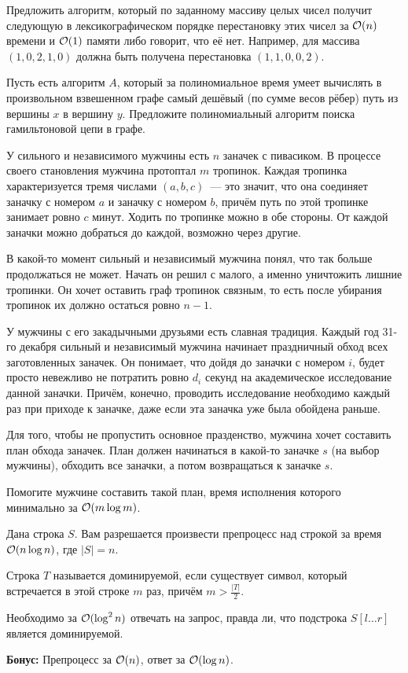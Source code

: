 \documentclass[addpoints]{exam}
\begin{document}
\begin{questions}
%

\question Предложить алгоритм, который по заданному массиву целых чисел получит следующую в лексикографическом порядке перестановку этих чисел за $\mathcal{O}(n)$ времени и $\mathcal{O}(1)$ памяти либо говорит, что её нет. Например, для массива $(1,0,2,1,0)$ должна быть получена перестановка $(1,1,0,0,2)$.

\question Пусть есть алгоритм $A$, который за полиномиальное время умеет вычислять в произвольном взвешенном графе самый дешёвый (по сумме весов рёбер) путь из вершины $x$ в вершину $y$. Предложите полиномиальный алгоритм поиска гамильтоновой цепи в графе.

\question У сильного и независимого мужчины есть $n$ заначек с пивасиком. В процессе своего становления мужчина протоптал $m$ тропинок. Каждая тропинка характеризуется тремя числами $(a,b,c)$~--- это значит, что она соединяет заначку с номером $a$ и заначку с номером $b$, причём путь по этой тропинке занимает ровно $c$ минут. Ходить по тропинке можно в обе стороны. От каждой заначки можно добраться до каждой, возможно через другие.

В какой-то момент сильный и независимый мужчина понял, что так больше продолжаться не может. Начать он решил с малого, а именно уничтожить лишние тропинки. Он хочет оставить граф тропинок связным, то есть после убирания тропинок их должно остаться ровно $n-1$.

У мужчины с его закадычными друзьями есть славная традиция. Каждый год 31-го декабря сильный и независимый мужчина начинает праздничный обход всех заготовленных заначек. Он понимает, что дойдя до заначки с номером $i$, будет просто невежливо не потратить ровно $d_i$ секунд на академическое исследование данной заначки. Причём, конечно, проводить исследование необходимо каждый раз при приходе к заначке, даже если эта заначка уже была обойдена раньше. 

Для того, чтобы не пропустить основное празденство, мужчина хочет составить план обхода заначек. План должен начинаться в какой-то заначке $s$ (на выбор мужчины), обходить все заначки, а потом возвращаться к заначке $s$.

Помогите мужчине составить такой план, время исполнения которого минимально за $\mathcal{O}(m \log{m})$.

\question Дана строка $S$. Вам разрешается произвести препроцесс над строкой за время $\mathcal{O}(n \log{n})$, где $|S| = n$. 

Строка $T$ называется доминируемой, если существует символ, который встречается в этой строке $m$ раз, причём $m > \frac{|T|}{2}$.

Необходимо за $\mathcal{O}(\log^2{n})$ отвечать на запрос, правда ли, что подстрока $S[l\ldots r]$ является доминируемой.

\textbf{Бонус:} Препроцесс за $\mathcal{O}(n)$, ответ за $\mathcal{O}(\log{n})$.

\end{questions}

\begin{center}
\pointtable[h][questions]
\end{center}
\end{document}
